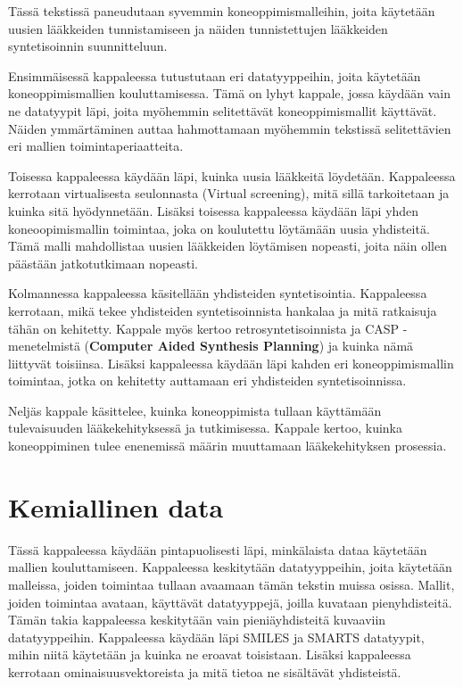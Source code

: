 \documentclass[finnish,twoside,censored,tkt,sw-line]{HYthesisML}
\begin{document}
Tässä tekstissä paneudutaan syvemmin koneoppimismalleihin, joita käytetään uusien lääkkeiden tunnistamiseen ja näiden tunnistettujen lääkkeiden syntetisoinnin suunnitteluun.

Ensimmäisessä kappaleessa tutustutaan eri datatyyppeihin, joita käytetään koneoppimismallien kouluttamisessa.
Tämä on lyhyt kappale, jossa käydään vain ne datatyypit läpi, joita myöhemmin selitettävät koneoppimismallit käyttävät.
Näiden ymmärtäminen auttaa hahmottamaan myöhemmin tekstissä selitettävien eri mallien toimintaperiaatteita.

Toisessa kappaleessa käydään läpi, kuinka uusia lääkkeitä löydetään.
Kappaleessa kerrotaan virtualisesta seulonnasta (Virtual screening), mitä sillä tarkoitetaan ja kuinka sitä hyödynnetään.
Lisäksi toisessa kappaleessa käydään läpi yhden koneoopimismallin toimintaa, joka on koulutettu löytämään uusia yhdisteitä.
Tämä malli mahdollistaa uusien lääkkeiden löytämisen nopeasti, joita näin ollen päästään jatkotutkimaan nopeasti.

Kolmannessa kappaleessa käsitellään yhdisteiden syntetisointia.
Kappaleessa kerrotaan, mikä tekee yhdisteiden syntetisoinnista hankalaa ja mitä ratkaisuja tähän on kehitetty.
Kappale myös kertoo retrosyntetisoinnista ja CASP -menetelmistä (\textbf{Computer Aided Synthesis Planning}) ja kuinka nämä liittyvät toisiinsa.
Lisäksi kappaleessa käydään läpi kahden eri koneoppimismallin toimintaa, jotka on kehitetty auttamaan eri yhdisteiden syntetisoinnissa.

Neljäs kappale käsittelee, kuinka koneoppimista tullaan käyttämään tulevaisuuden lääkekehityksessä ja tutkimisessa.
Kappale kertoo, kuinka koneoppiminen tulee enenemissä määrin muuttamaan lääkekehityksen prosessia.

\chapter{Kemiallinen data}

Tässä kappaleessa käydään pintapuolisesti läpi, minkälaista dataa käytetään mallien kouluttamiseen.
Kappaleessa keskitytään datatyyppeihin, joita käytetään malleissa, joiden toimintaa tullaan avaamaan tämän tekstin muissa osissa.
Mallit, joiden toimintaa avataan, käyttävät datatyyppejä, joilla kuvataan pienyhdisteitä.
Tämän takia kappaleessa keskitytään vain pieniäyhdisteitä kuvaaviin datatyyppeihin.
Kappaleessa käydään läpi SMILES ja SMARTS datatyypit, mihin niitä käytetään ja kuinka ne eroavat toisistaan.
Lisäksi kappaleessa kerrotaan ominaisuusvektoreista ja mitä tietoa ne sisältävät yhdisteistä.
\end{document}
